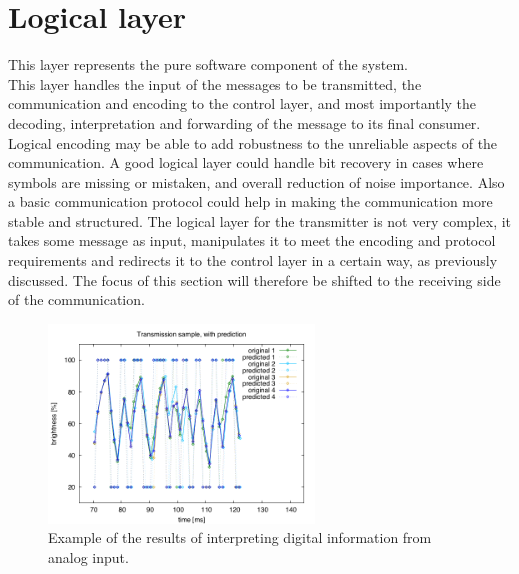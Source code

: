 
\section{Logical layer}
This layer represents the pure software component of the system.\\
This layer handles the input of the messages to be transmitted, the communication and encoding to the control layer, and most importantly the decoding, interpretation and forwarding of the message to its final consumer.
Logical encoding may be able to add robustness to the unreliable aspects of the communication.
A good logical layer could handle bit recovery in cases where symbols are missing or mistaken, and overall reduction of noise importance. 
Also a basic communication protocol could help in making the communication more stable and structured.
The logical layer for the transmitter is not very complex, it takes some message as input, manipulates it to meet the encoding and protocol requirements and redirects it to the control layer in a certain way, as previously discussed. 
The focus of this section will therefore be shifted to the receiving side of the communication.
 
\begin{figure}[htbp] %
   \centering
   \includegraphics[height=200px]{img/sample} 
   \caption{Example of the results of interpreting digital information from analog input.}
   \label{fig:sample}
\end{figure}

